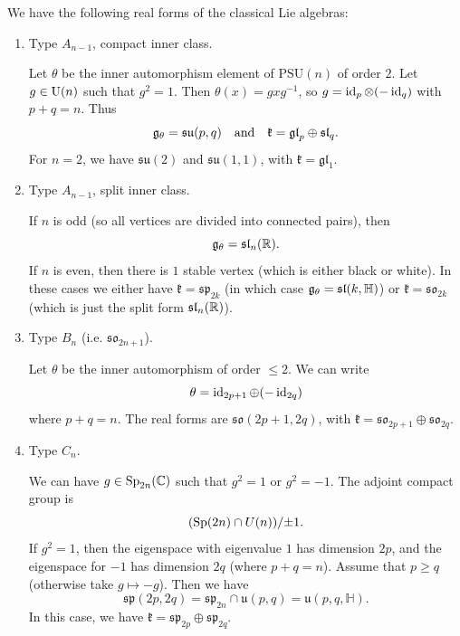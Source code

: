 \begin{example}
  We have the following real forms of
  the classical Lie algebras:
  \begin{enumerate}
    \item Type $A_{n - 1}$, compact inner
      class.

      Let $\theta$ be the inner automorphism
      element of $\mathrm{PSU}(n)$
      of order $2$. Let
      $g \in \operatorname{U}(n)$ such that $g^2 = 1$.
      Then $\theta(x) = gxg^{-1}$, so
      $g = \operatorname{id}_p \otimes (-\operatorname{id}_q)$
      with $p + q = n$. Thus
      \[
        \mathfrak{g}_\theta = \mathfrak{su}(p, q)
        \quad \text{and} \quad
        \mathfrak{k}
        = \mathfrak{gl}_p \oplus \mathfrak{sl}_q.
      \]
      For $n = 2$, we have
      $\mathfrak{su}(2)$ and
      $\mathfrak{su}(1, 1)$, with
      $\mathfrak{k} = \mathfrak{gl}_1$.
    \item Type $A_{n - 1}$, split inner class.

      If $n$ is odd (so all vertices
      are divided into connected pairs),
      then
      \[
        \mathfrak{g}_\theta = \mathfrak{sl}_n(\mathbb{R}).
      \]
      If $n$ is even, then there is
      $1$ stable vertex (which is either
      black or white). In these cases
      we either have
      $\mathfrak{k} = \mathfrak{sp}_{2k}$
      (in which case $\mathfrak{g}_\theta = \mathfrak{sl}(k, \mathbb{H})$) or
      $\mathfrak{k} = \mathfrak{so}_{2k}$
      (which is just the split form
      $\mathfrak{sl}_n(\mathbb{R})$).
    \item Type $B_n$ (i.e. $\mathfrak{so}_{2n + 1}$).

      Let $\theta$ be the inner automorphism
      of order $\le 2$. We can write
      \[
        \theta = \operatorname{id}_{2p + 1} \oplus (-\operatorname{id}_{2q})
      \]
      where $p + q = n$. The real forms
      are $\mathfrak{so}(2p + 1, 2q)$,
      with $\mathfrak{k} = \mathfrak{so}_{2p + 1} \oplus \mathfrak{so}_{2q}$.
    \item Type $C_n$.

      We can have
      $g \in \operatorname{Sp}_{2n}(\mathbb{C})$ such that
      $g^2 = 1$ or $g^2 = -1$. The adjoint
      compact group is
      \[(\operatorname{Sp}(2n) \cap U(n)) / {\pm 1}.\]
      If $g^2 = 1$, then the eigenspace
      with eigenvalue $1$ has dimension
      $2p$, and the eigenspace for
      $-1$ has dimension $2q$ (where
      $p + q = n$). Assume that
      $p \ge q$ (otherwise take $g \mapsto -g$).
      Then we have
      \[
        \mathfrak{sp}(2p, 2q)
        = \mathfrak{sp}_{2n} \cap \mathfrak{u}(p, q)
        = \mathfrak{u}(p, q, \mathbb{H}).
      \]
      In this case, we have
      $\mathfrak{k} = \mathfrak{sp}_{2p} \oplus \mathfrak{sp}_{2q}$.


\end{enumerate}
\end{example}
